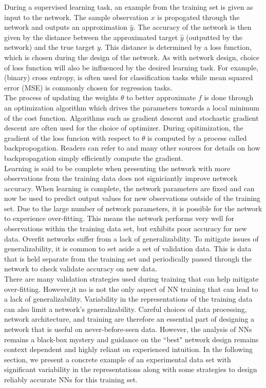 \documentclass[12pt]{article}
\begin{document}
\indent During a supervised learning task, an example from the training set is given as input to the network. The sample observation $x$ is propogated through the network and outputs an approximation $\hat y$. The accuracy of the network is then given by the distance between the approximated target $\hat y$ (outputted by the network) and the true target $y$. This distance is determined by a loss function, which is chosen during the design of the network. As with network design, choice of loss function will also be influenced by the desired learning task. For example, (binary) cross entropy, is often used for classification tasks while mean squared error (MSE) is commonly chosen for regression tasks. \\
\indent The process of updating the weights $\theta$ to better approximate $f$ is done through an optimization algorithm which drives the parameters towards a local minimum of the cost function. Algorithms such as gradient descent and stochastic gradient descent are often used for the choice of optimizer. During opitimization, the gradient of the loss funcion with respect to $\theta$ is computed by a process called backpropogation. Readers can refer to \cite{bengio} and many other sources for details on how backpropagation simply efficiently compute the gradient.  \\
\indent Learning is said to be complete when presenting the network with more observations from the training data does not signiciantly improve network accuracy. When learning is complete, the network parameters are fixed and can now be used to predict output values for new observations outside of the training set. Due to the large number of network parameters, it is possible for the network to experience over-fitting. This means the network performs very well for observations within the training data set, but exhibits poor accuracy for new data. Overfit networks suffer from a lack of generalizability. To mitigate issues of generalizability, it is common to set aside a set of validation data. This is data that is held separate from the training set and periodically passed through the network to check validate accuracy on new data.  \\
\indent There are many validation strategies used during training that can help mitigate over-fitting. However,it no is not the only aspect of NN training that can lead to a lack of generalizability. Variability in the representations of the training data can also limit a network's generalizability. Careful choices of data processing, network architecture, and training are therefore an essential part of designing a network that is useful on never-before-seen data. However, the analysis of NNs remains a black-box mystery and guidance on the ``best" network design remains context dependent and highly reliant on experienced intuition. In the following section, we present a concrete example of an experimental data set with significant variability in the representations along with some strategies to design reliably accurate NNs for this training set.
\end{document}
